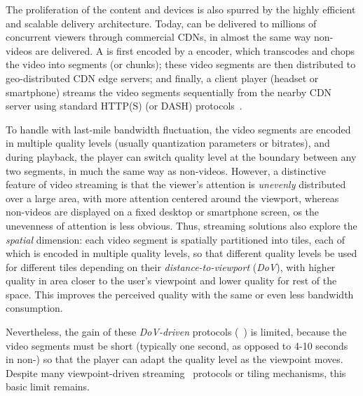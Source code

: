 The proliferation of the \vrvideo content and devices is also spurred by the highly efficient and scalable delivery architecture. 
Today, \vrvideos can be delivered to millions of concurrent viewers through commercial CDNs, in almost the same way non-\vr videos are delivered.
A \vrvideo is first encoded by a \vr encoder, which transcodes and chops the video into segments (or chunks); these video segments are then distributed to geo-distributed CDN edge servers; and finally, a client player (headset or smartphone) streams the video segments sequentially from the nearby CDN server using standard HTTP(S) (or DASH) protocols~\cite{hls,https://www.wowza.com/solutions/streaming-types/virtual-reality-and-360-degree-streaming}.

To handle with last-mile bandwidth fluctuation, the video segments are encoded in multiple quality levels (usually quantization parameters or bitrates), and during playback, the \vrvideo player can switch quality level at the boundary between any two segments, in much the same way as non-\vr videos.
However, a distinctive feature of \vr video streaming is that the viewer's attention is {\em unevenly} distributed over a large area, with more attention centered around the viewport, whereas non-\vr videos are displayed on a fixed desktop or smartphone screen, os the unevenness of attention is less obvious.
Thus, \vrvideo streaming solutions also explore the {\em spatial} dimension: each video segment is spatially partitioned into tiles, each of which is encoded in multiple quality levels, so that different quality levels be used for different tiles depending on their {\em distance-to-viewport} ({\em DoV}), with higher quality in area closer to the user's viewpoint and lower quality for rest of the space.
This improves the perceived quality with the same or even less bandwidth consumption. 

Nevertheless, the gain of these {\em DoV-driven} protocols (\eg~\cite{??,??,??}) is limited, because the video segments must be short (typically one second, as opposed to 4-10 seconds in non-\vrvideos) so that the player can adapt the quality level as the viewpoint moves. 
Despite many viewpoint-driven streaming~\cite{??,??,??} protocols or tiling mechanisms, this basic limit remains.



